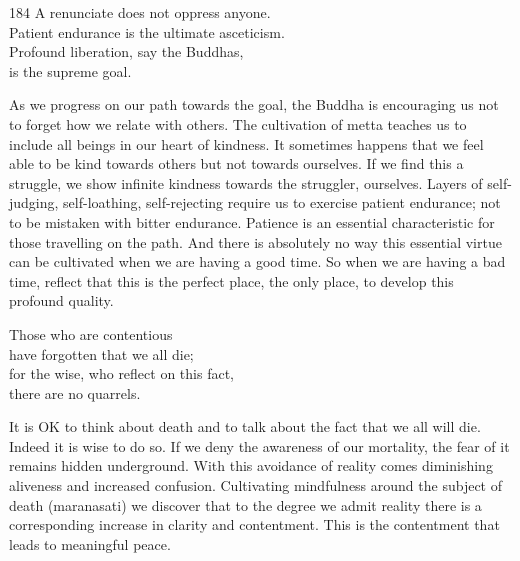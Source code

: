 
\begin{dhpVerse}{184}
\label{dhp-184}
A renunciate does not oppress anyone.\\
Patient endurance is the ultimate asceticism.\\
Profound liberation, say the Buddhas,\\
is the supreme goal.
\end{dhpVerse}

\begin{dhpRefl}

As we progress on our path towards the goal, the Buddha is
encouraging us not to forget how we relate with others. The
cultivation of metta teaches us to include all beings in our heart of
kindness. It sometimes happens that we feel able to be kind towards
others but not towards ourselves. If we find this a struggle, we show
infinite kindness towards the struggler, ourselves. Layers of
self-judging, self-loathing, self-rejecting require us to exercise
patient endurance; not to be mistaken with bitter endurance. Patience
is an essential characteristic for those travelling on the path. And
there is absolutely no way this essential virtue can be cultivated
when we are having a good time. So when we are having a bad time,
reflect that this is the perfect place, the only place, to develop
this profound quality.

\end{dhpRefl}


\begin{dhpVerse}{6}
\label{dhp-6}
Those who are contentious\\
have forgotten that we all die;\\
for the wise, who reflect on this fact,\\
there are no quarrels.
\end{dhpVerse}

\begin{dhpRefl}

It is OK to think about death and to talk about the fact that we all
will die. Indeed it is wise to do so. If we deny the awareness of our
mortality, the fear of it remains hidden underground. With this
avoidance of reality comes diminishing aliveness and increased
confusion. Cultivating mindfulness around the subject of death
(maranasati) we discover that to the degree we admit reality there is
a corresponding increase in clarity and contentment. This is the
contentment that leads to meaningful peace.

\end{dhpRefl}

